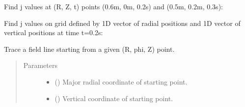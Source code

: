 \documentclass[letterpaper,10pt,english]{sphinxmanual}
\begin{document}
\begin{fulllineitems}
\begin{fulllineitems}
Find j values at (R, Z, t) points (0.6m, 0m, 0.2s) and
(0.5m, 0.2m, 0.3s):

\begin{sphinxVerbatim}[commandchars=\\\{\}]
  \PYG{p}{[} \PYG{p}{]} \PYG{p}{[} \PYG{p}{]} \PYG{p}{[} \PYG{p}{]} 
\end{sphinxVerbatim}

Find j values on grid defined by 1D vector of radial positions 
and 1D vector of vertical positions  at time t=0.2s:

\begin{sphinxVerbatim}[commandchars=\\\{\}]
     
\end{sphinxVerbatim}

\end{fulllineitems}


\begin{fulllineitems}
\label{\detokenize{eqtools:eqtools.core.Equilibrium.rz2FieldLineTrace}}
Trace a field line starting from a given (R, phi, Z) point.
\begin{quote}\begin{description}
\item[{Parameters}] \leavevmode\begin{itemize}
\item {} 
 () \textendash{} Major radial coordinate of starting point.

\item {} 
 () \textendash{} Vertical coordinate of starting point.


\end{itemize}
\end{description}
\end{quote}
\end{fulllineitems}
\end{fulllineitems}
\end{document}
